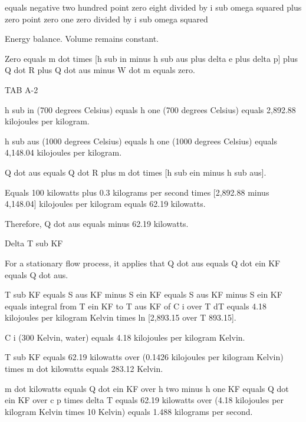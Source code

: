 equals negative two hundred point zero eight divided by i sub omega squared plus zero point zero one zero divided by i sub omega squared

Energy balance. Volume remains constant.

Zero equals m dot times [h sub in minus h sub aus plus delta e plus delta p] plus Q dot R plus Q dot aus minus W dot m equals zero.

TAB A-2

h sub in (700 degrees Celsius) equals h one (700 degrees Celsius) equals 2,892.88 kilojoules per kilogram.

h sub aus (1000 degrees Celsius) equals h one (1000 degrees Celsius) equals 4,148.04 kilojoules per kilogram.

Q dot aus equals Q dot R plus m dot times [h sub ein minus h sub aus].

Equals 100 kilowatts plus 0.3 kilograms per second times [2,892.88 minus 4,148.04] kilojoules per kilogram equals 62.19 kilowatts.

Therefore, Q dot aus equals minus 62.19 kilowatts.

Delta T sub KF

For a stationary flow process, it applies that Q dot aus equals Q dot ein KF equals Q dot aus.

T sub KF equals S aus KF minus S ein KF equals S aus KF minus S ein KF equals integral from T ein KF to T aus KF of C i over T dT equals 4.18 kilojoules per kilogram Kelvin times ln [2,893.15 over T 893.15].

C i (300 Kelvin, water) equals 4.18 kilojoules per kilogram Kelvin.

T sub KF equals 62.19 kilowatts over (0.1426 kilojoules per kilogram Kelvin) times m dot kilowatts equals 283.12 Kelvin.

m dot kilowatts equals Q dot ein KF over h two minus h one KF equals Q dot ein KF over c p times delta T equals 62.19 kilowatts over (4.18 kilojoules per kilogram Kelvin times 10 Kelvin) equals 1.488 kilograms per second.